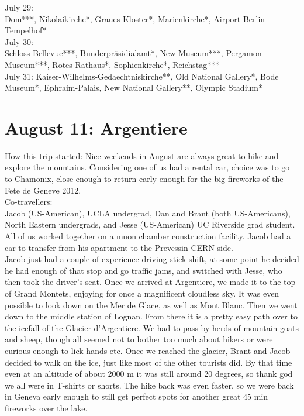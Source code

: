 July 29:\\
Dom***, Nikolaikirche*, Graues Kloster*, Marienkirche*, Airport Berlin-Tempelhof*\\

July 30:\\
Schloss Bellevue***, Bunderpr\"asidialamt*, New Museum***, Pergamon Museum***, Rotes Rathaus*, Sophienkirche*, Reichstag***\\

July 31:
Kaiser-Wilhelms-Gedaechtniskirche**, Old National Gallery*, Bode Museum*, Ephraim-Palais, New National Gallery**, Olympic Stadium*

\section{August 11: Argentiere}
\label{Argentiere2012}

How this trip started: Nice weekends in August are always great to hike and explore the mountains. Considering one of us had a rental car, choice was to go to Chamonix, close enough to return early enough for the big fireworks of the Fete de Geneve 2012.\\

Co-travellers:\\
Jacob (US-American), UCLA undergrad, Dan and Brant (both US-Americans), North Eastern undergrads, and Jesse (US-American) UC Riverside grad student. All of us worked together on a muon chamber construction facility. Jacob had a car to transfer from his apartment to the Prevessin CERN side.\\

Jacob just had a couple of experience driving stick shift, at some point he decided he had enough of that stop and go traffic jams, and switched with Jesse, who then took the driver's seat. Once we arrived at Argentiere, we made it to the top of Grand Montets, enjoying for once a magnificent cloudless sky. It was even possible to look down on the Mer de Glace, as well as Mont Blanc. Then we went down to the middle station of Lognan. From there it is a pretty easy path over to the icefall of the Glacier d'Argentiere. We had to pass by herds of mountain goats and sheep, though all seemed not to bother too much about hikers or were curious enough to lick hands etc. Once we reached the glacier, Brant and Jacob decided to walk on the ice, just like most of the other tourists did. By that time even at an altitude of about 2000 m it was still around 20 degrees, so thank god we all were in T-shirts or shorts. The hike back was even faster, so we were back in Geneva early enough to still get perfect spots for another great 45 min fireworks over the lake.\\

